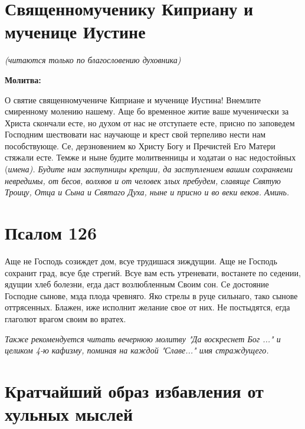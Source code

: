 \section{Священномученику Киприану и мученице Иустине}
 


\itshape (читаются только по благословению духовника)\normalfont{}


\medskip


\bfseries Молитва:\normalfont{}


 О святие священномучениче Киприане и мученице Иустина! Внемлите смиренному молению нашему. Аще бо временное житие ваше мученически за Христа скончали есте, но духом от нас не отступаете есте, присно по заповедем Господним шествовати нас научающе и крест свой терпеливо нести нам пособствующе. Се, дерзновением ко Христу Богу и Пречистей Его Матери стяжали есте. Темже и ныне будите молитвенницы и ходатаи о нас недостойных (\itshape имена\normalfont{}). Будите нам заступницы крепции, да заступлением вашим сохраняеми невредимы, от бесов, волхвов и от человек злых пребудем, славяще Святую Троицу, Отца и Сына и Святаго Духа, ныне и присно и во веки веков. Аминь.


\section{Псалом 126}
 


Аще не Господь созиждет дом, всуе трудишася зиждущии. Аще не Господь сохранит град, всуе бде стрегий. Всуе вам есть утреневати, востанете по седении, ядущии хлеб болезни, егда даст возлюбленным Своим сон. Се достояние Господне сынове, мзда плода чревняго. Яко стрелы в руце сильнаго, тако сынове оттрясенных. Блажен, иже исполнит желание свое от них. Не постыдятся, егда глаголют врагом своим во вратех.

\itshape Также рекомендуется читать вечернюю молитву  "Да воскреснет Бог ..." и целиком 4-ю кафизму, поминая на каждой "Славе..." имя страждущего.

\normalfont{} 


\mychapterending


 

\section{Кратчайший образ избавления от хульных мыслей}
 




